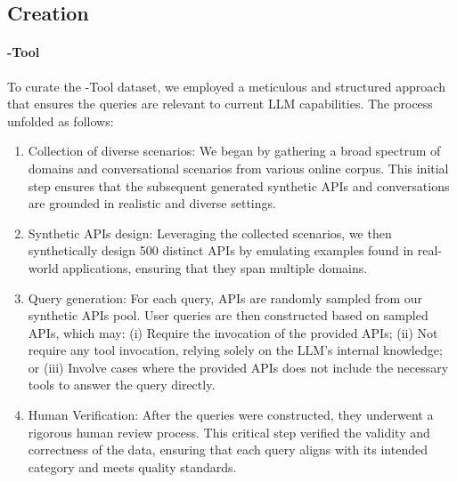 

\subsection{\dname Creation}
\paragraph{\dname-Tool} 
To curate the \dname-Tool dataset, we employed a meticulous and structured approach that ensures the queries are relevant to current LLM capabilities. The process unfolded as follows:

\begin{enumerate}[leftmargin=*, itemsep=0em, topsep=-0.0em]
    \item Collection of diverse scenarios: We began by gathering a broad spectrum of domains and conversational scenarios from various online corpus. This initial step ensures that the subsequent generated synthetic APIs and conversations are grounded in realistic and diverse settings. 
    \item Synthetic APIs design: Leveraging the collected scenarios, we then synthetically design 500 distinct APIs by emulating examples found in real-world applications, ensuring that they span multiple domains.
    \item  Query generation: For each query, APIs are randomly sampled from our synthetic APIs pool. User queries are then constructed based on sampled APIs, which may: (i) Require the invocation of the provided APIs; (ii) Not require any tool invocation, relying solely on the LLM’s internal knowledge; or (iii) Involve cases where the provided APIs does not include the necessary tools to answer the query directly. 
    \item Human Verification: After the queries were constructed, they underwent a rigorous human review process. This critical step verified the validity and correctness of the data, ensuring that each query aligns with its intended category and meets quality standards.
\end{enumerate}

